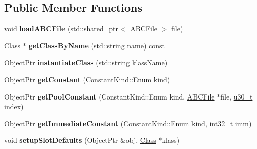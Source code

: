 \subsection*{Public Member Functions}
\begin{DoxyCompactItemize}
\item 
\hypertarget{classjswf_1_1avm2_1_1_v_m_a60f22035ed84bbc7e8ad5ec4164fa5b7}{void {\bfseries load\+A\+B\+C\+File} (std\+::shared\+\_\+ptr$<$ \hyperlink{classjswf_1_1avm2_1_1_a_b_c_file}{A\+B\+C\+File} $>$ file)}\label{classjswf_1_1avm2_1_1_v_m_a60f22035ed84bbc7e8ad5ec4164fa5b7}

\item 
\hypertarget{classjswf_1_1avm2_1_1_v_m_aaaf65986d7a33891dc3aecee61b3c35d}{\hyperlink{classjswf_1_1avm2_1_1_class}{Class} $\ast$ {\bfseries get\+Class\+By\+Name} (std\+::string name) const }\label{classjswf_1_1avm2_1_1_v_m_aaaf65986d7a33891dc3aecee61b3c35d}

\item 
\hypertarget{classjswf_1_1avm2_1_1_v_m_a74ba8c1bf76ce3d59cda948e18ff7a42}{Object\+Ptr {\bfseries instantiate\+Class} (std\+::string klass\+Name)}\label{classjswf_1_1avm2_1_1_v_m_a74ba8c1bf76ce3d59cda948e18ff7a42}

\item 
\hypertarget{classjswf_1_1avm2_1_1_v_m_ab6500f435af74ed018d45e984de65624}{Object\+Ptr {\bfseries get\+Constant} (Constant\+Kind\+::\+Enum kind)}\label{classjswf_1_1avm2_1_1_v_m_ab6500f435af74ed018d45e984de65624}

\item 
\hypertarget{classjswf_1_1avm2_1_1_v_m_adfd3f8b1d67e5b03bd8bcbffb7ef83a4}{Object\+Ptr {\bfseries get\+Pool\+Constant} (Constant\+Kind\+::\+Enum kind, \hyperlink{classjswf_1_1avm2_1_1_a_b_c_file}{A\+B\+C\+File} $\ast$file, \hyperlink{namespacejswf_aa10d9ddca2a6a5debdc261dfae3d1117}{u30\+\_\+t} index)}\label{classjswf_1_1avm2_1_1_v_m_adfd3f8b1d67e5b03bd8bcbffb7ef83a4}

\item 
\hypertarget{classjswf_1_1avm2_1_1_v_m_a7d3a28e2baf70ed591f78f805364ec6c}{Object\+Ptr {\bfseries get\+Immediate\+Constant} (Constant\+Kind\+::\+Enum kind, int32\+\_\+t imm)}\label{classjswf_1_1avm2_1_1_v_m_a7d3a28e2baf70ed591f78f805364ec6c}

\item 
\hypertarget{classjswf_1_1avm2_1_1_v_m_afc64ee7a30ff57209259998a1e198c30}{void {\bfseries setup\+Slot\+Defaults} (Object\+Ptr \&obj, \hyperlink{classjswf_1_1avm2_1_1_class}{Class} $\ast$klass)}\label{classjswf_1_1avm2_1_1_v_m_afc64ee7a30ff57209259998a1e198c30}


\end{DoxyCompactItemize}
